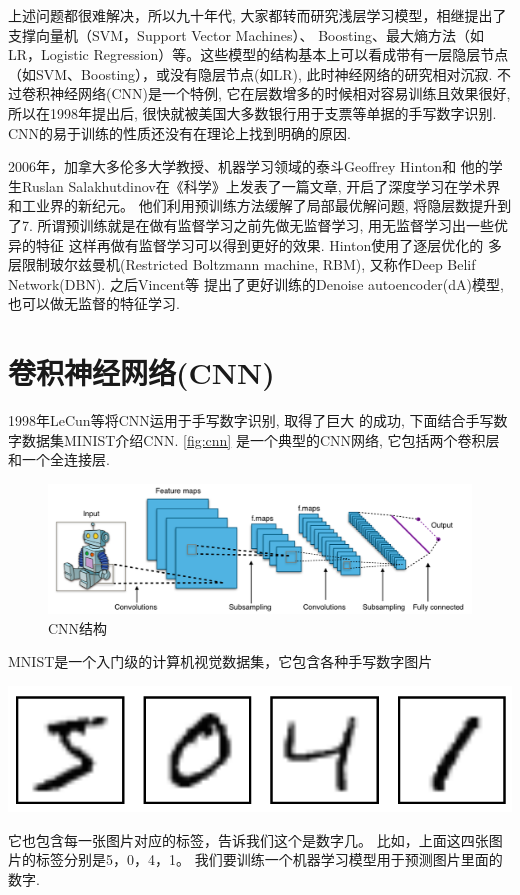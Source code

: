 \documentclass{ctexart}
\begin{document}
上述问题都很难解决，所以九十年代, 大家都转而研究浅层学习模型，相继提出了支撑向量机（SVM，Support
Vector Machines）、 Boosting、最大熵方法（如LR，Logistic
Regression）等。这些模型的结构基本上可以看成带有一层隐层节点（如SVM、Boosting），或没有隐层节点(如LR),
此时神经网络的研究相对沉寂.
不过卷积神经网络(CNN)是一个特例, 它在层数增多的时候相对容易训练且效果很好,
所以在1998年提出后, 很快就被美国大多数银行用于支票等单据的手写数字识别.
CNN的易于训练的性质还没有在理论上找到明确的原因.

2006年，加拿大多伦多大学教授、机器学习领域的泰斗Geoffrey Hinton和
他的学生Ruslan Salakhutdinov在《科学》上发表了一篇文章\cite{hinton2006reducing},
开启了深度学习在学术界和工业界的新纪元。
他们利用预训练方法缓解了局部最优解问题, 将隐层数提升到了7.
所谓预训练就是在做有监督学习之前先做无监督学习, 用无监督学习出一些优异的特征
这样再做有监督学习可以得到更好的效果. Hinton使用了逐层优化的
多层限制玻尔兹曼机(Restricted Boltzmann machine, RBM),
又称作Deep Belif Network(DBN). 之后Vincent等\cite{vincent2008extracting}
提出了更好训练的Denoise autoencoder(dA)模型, 也可以做无监督的特征学习.

\section{卷积神经网络(CNN)}
1998年LeCun等\cite{lecun1998gradient}将CNN运用于手写数字识别, 取得了巨大
的成功, 下面结合手写数字数据集MINIST介绍CNN. \autoref{fig:cnn}
是一个典型的CNN网络, 它包括两个卷积层和一个全连接层.
\begin{figure}[htb]
  \centering
  \includegraphics[width=.8\textwidth]{Typical_cnn}
  \caption{CNN结构}
  \label{fig:cnn}
\end{figure}

MNIST是一个入门级的计算机视觉数据集，它包含各种手写数字图片\\
{\centering
  \includegraphics[width=.8\textwidth]{minist}

}
它也包含每一张图片对应的标签，告诉我们这个是数字几。
比如，上面这四张图片的标签分别是5，0，4，1。
我们要训练一个机器学习模型用于预测图片里面的数字.
\end{document}
